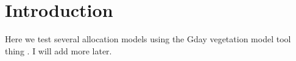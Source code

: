 \chapter{Introduction}

Here we test several allocation models using the Gday vegetation model tool thing \citep{Comins1993,Corbeels2005}. I will add more later.
